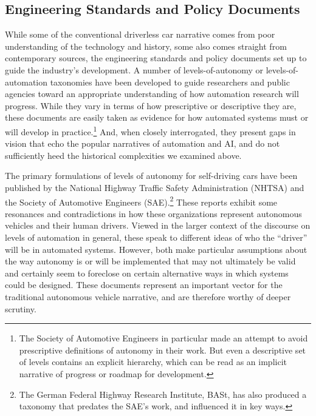 \subsection{Engineering Standards and Policy Documents}



While some of the conventional driverless car narrative comes from
poor understanding of the technology and history, some also comes
straight from contemporary sources, the engineering standards and
policy documents set up to
guide the industry's development. A number of levels-of-autonomy or
levels-of-automation taxonomies have been developed to guide
researchers and public agencies toward an appropriate understanding of
how automation research will progress. While they vary in terms of how
prescriptive or descriptive they are, these documents are easily taken
as evidence for how automated systems must or will develop in
practice.\footnote{The Society of Automotive Engineers in particular
  made an attempt to avoid prescriptive definitions of autonomy in
  their work. But even a descriptive set of levels contains an
  explicit hierarchy, which can be read as an implicit narrative of
  progress or roadmap for development.} And, when closely
interrogated, they present gaps in vision that echo the popular
narratives of automation and AI, and do not sufficiently heed the
historical complexities we examined above.

The primary formulations of levels of autonomy for self-driving cars
have been published by the National Highway Traffic Safety
Administration (NHTSA) and the Society of Automotive Engineers
(SAE).\footnote{The German Federal Highway Research Institute, BASt,
 has also produced a taxonomy that predates the SAE's work, and
 influenced it in key ways.}
These reports exhibit some resonances and contradictions in how these
organizations represent autonomous vehicles and their human drivers.
Viewed in the larger context of the discourse on levels of automation
in general, these speak to different ideas of who the ``driver'' will be
in automated systems. However, both make particular assumptions about
the way autonomy is or will be implemented that may not ultimately be
valid and certainly seem to foreclose on certain alternative ways in
which systems could be designed. These documents represent an important
vector for the traditional autonomous vehicle narrative, and are
therefore worthy of deeper scrutiny.

